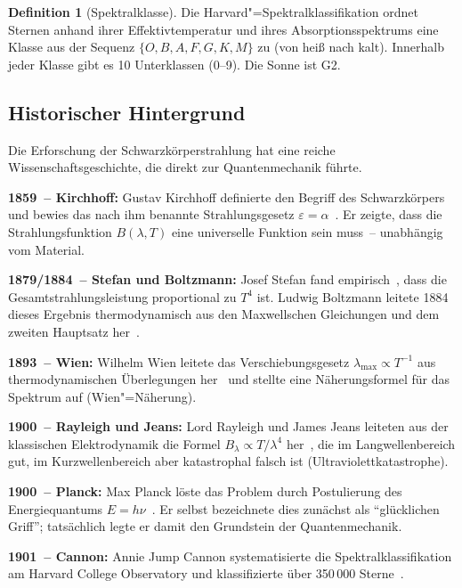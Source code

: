 ﻿\documentclass[a4paper,12pt]{article}
\theoremstyle{definition}
\newtheorem{definition}{Definition}
\begin{document}
\begin{definition}[Spektralklasse]
    Die Harvard"=Spektralklassifikation ordnet Sternen anhand ihrer Effektivtemperatur
    und ihres Absorptionsspektrums eine Klasse aus der Sequenz
    $\{O, B, A, F, G, K, M\}$ zu (von heiß nach kalt). Innerhalb jeder Klasse
    gibt es 10 Unterklassen (0--9). Die Sonne ist G2.
\end{definition}

\subsection{Historischer Hintergrund}

Die Erforschung der Schwarzkörperstrahlung hat eine reiche Wissenschaftsgeschichte,
die direkt zur Quantenmechanik führte.

\textbf{1859~-- Kirchhoff:} Gustav Kirchhoff definierte den Begriff des Schwarzkörpers
und bewies das nach ihm benannte Strahlungsgesetz $\varepsilon = \alpha$~\cite{kirchhoff1860}.
Er zeigte, dass die Strahlungsfunktion $B(\lambda,T)$ eine universelle Funktion
sein muss~-- unabhängig vom Material.

\textbf{1879/1884~-- Stefan und Boltzmann:} Josef Stefan fand empirisch~\cite{stefan1879},
dass die Gesamtstrahlungsleistung proportional zu $T^4$ ist. Ludwig Boltzmann
leitete 1884 dieses Ergebnis thermodynamisch aus den Maxwellschen Gleichungen
und dem zweiten Hauptsatz her~\cite{boltzmann1884}.

\textbf{1893~-- Wien:} Wilhelm Wien leitete das Verschiebungsgesetz
$\lambda_{\max} \propto T^{-1}$ aus thermodynamischen Überlegungen her~\cite{wien1893}
und stellte eine Näherungsformel für das Spektrum auf (Wien"=Näherung).

\textbf{1900~-- Rayleigh und Jeans:} Lord Rayleigh und James Jeans leiteten aus der
klassischen Elektrodynamik die Formel $B_\lambda \propto T/\lambda^4$ her~\cite{rayleigh1900},
die im Langwellenbereich gut, im Kurzwellenbereich aber katastrophal falsch ist
(Ultraviolettkatastrophe).

\textbf{1900~-- Planck:} Max Planck löste das Problem durch Postulierung
des Energiequantums $E = h\nu$~\cite{planck1900}. Er selbst bezeichnete dies
zunächst als ``glücklichen Griff''; tatsächlich legte er damit den Grundstein
der Quantenmechanik.

\textbf{1901~-- Cannon:} Annie Jump Cannon systematisierte die Spektralklassifikation
am Harvard College Observatory und klassifizierte über 350\,000 Sterne~\cite{cannon1901}.
\end{document}
